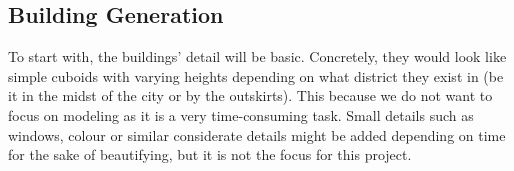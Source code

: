\subsection{Building Generation}
To start with, the buildings’ detail will be basic.
Concretely, they would look like simple cuboids with varying heights depending on what district they exist in (be it in the midst of the city or by the outskirts).
This because we do not want to focus on modeling as it is a very time-consuming task.
Small details such as windows, colour or similar considerate details might be added depending on time for the sake of beautifying, but it is not the focus for this project.

